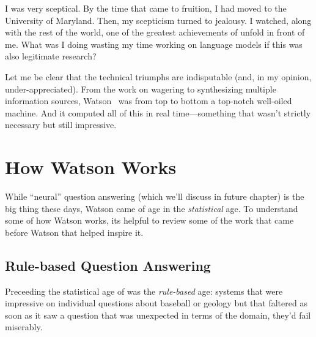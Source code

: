 I was very sceptical.
%
By the time that \watson{} came to fruition, I had moved to the
University of Maryland.
%
Then, my scepticism turned to jealousy.
%
I watched, along with the rest of the world, one of the greatest
achievements of  unfold in front of me.
%
What was I doing wasting my time working on language models if this was
also legitimate research?

Let me be clear that the technical triumphs are indisputable (and, in
my opinion, under-appreciated).
%
From the work on wagering to synthesizing multiple information sources,
Watson~\citep{ferruci-10} was from top to bottom a top-notch well-oiled
machine.
%
And it computed all of this in real time---something that wasn't
strictly necessary but still impressive.

\section{How Watson Works}

While ``neural'' question answering (which we'll discuss in future
chapter) is the big thing these days, Watson came of age in the
\emph{statistical} age.
%
To understand some of how Watson works, its helpful to review some of
the work that came before Watson that helped inspire it.

\subsection{Rule-based Question Answering}

Preceeding the statistical age of  was the \emph{rule-based}
age: systems that were impressive on individual questions about
baseball or geology but that faltered as soon as it saw a question
that was unexpected in terms of the domain, they'd fail miserably.


